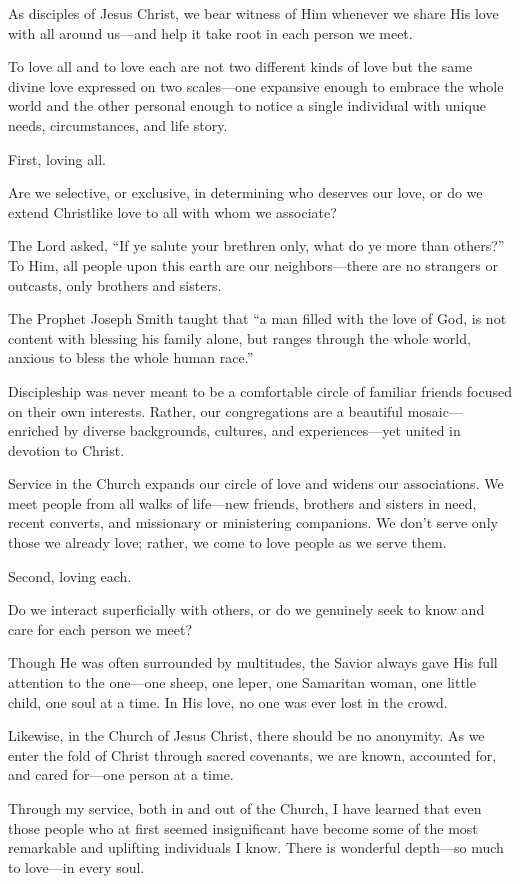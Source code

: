 \documentclass[letterpaper, 11pt]{report}
\begin{document}
As disciples of Jesus Christ, we bear witness of Him whenever we share His love with all around us—and help it take root in each person we meet.

To love all and to love each are not two different kinds of love but the same divine love expressed on two scales—one expansive enough to embrace the whole world and the other personal enough to notice a single individual with unique needs, circumstances, and life story.

First, loving all.

Are we selective, or exclusive, in determining who deserves our love, or do we extend Christlike love to all with whom we associate?

The Lord asked, “If ye salute your brethren only, what do ye more than others?” To Him, all people upon this earth are our neighbors—there are no strangers or outcasts, only brothers and sisters.

The Prophet Joseph Smith taught that “a man filled with the love of God, is not content with blessing his family alone, but ranges through the whole world, anxious to bless the whole human race.”

Discipleship was never meant to be a comfortable circle of familiar friends focused on their own interests. Rather, our congregations are a beautiful mosaic—enriched by diverse backgrounds, cultures, and experiences—yet united in devotion to Christ.

Service in the Church expands our circle of love and widens our associations. We meet people from all walks of life—new friends, brothers and sisters in need, recent converts, and missionary or ministering companions. We don’t serve only those we already love; rather, we come to love people as we serve them.

Second, loving each.

Do we interact superficially with others, or do we genuinely seek to know and care for each person we meet?

Though He was often surrounded by multitudes, the Savior always gave His full attention to the one—one sheep, one leper, one Samaritan woman, one little child, one soul at a time. In His love, no one was ever lost in the crowd.

Likewise, in the Church of Jesus Christ, there should be no anonymity. As we enter the fold of Christ through sacred covenants, we are known, accounted for, and cared for—one person at a time.

Through my service, both in and out of the Church, I have learned that even those people who at first seemed insignificant have become some of the most remarkable and uplifting individuals I know. There is wonderful depth—so much to love—in every soul.
\end{document}

